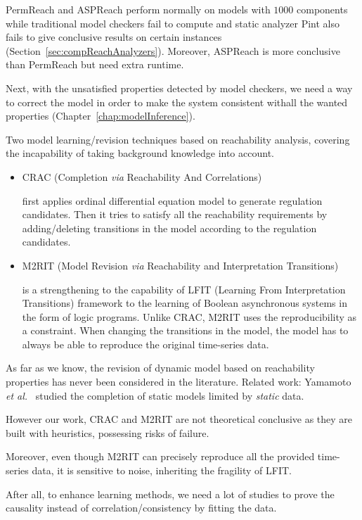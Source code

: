 PermReach and ASPReach perform normally on models with $1000$ components while traditional model checkers fail to compute and static analyzer Pint also fails to give conclusive results on certain instances (Section~\ref{sec:compReachAnalyzers}).
Moreover, ASPReach is more conclusive than PermReach but need extra runtime.

Next, with the unsatisfied properties detected by model checkers, we need a way to correct the model in order to make the system consistent withall the wanted properties (Chapter~\ref{chap:modelInference}).

Two model learning/revision techniques based on reachability analysis, covering the incapability of taking background knowledge into account.

\begin{itemize}
    \item CRAC (Completion \textit{via} Reachability And Correlations)
    
    first applies ordinal differential equation model to generate regulation candidates.
    Then it tries to satisfy all the reachability requirements by adding/deleting transitions in the model according to the regulation candidates.
    
    \item M2RIT (Model Revision \textit{via} Reachability and Interpretation Transitions)
    
    is a strengthening to the capability of LFIT (Learning From Interpretation Transitions) framework to the learning of Boolean asynchronous systems in the form of logic programs.
    Unlike CRAC, M2RIT uses the reproducibility as a constraint.
    When changing the transitions in the model, the model has to always be able to reproduce the original time-series data.
\end{itemize}

As far as we know, the revision of dynamic model based on reachability properties has never been considered in the literature.
Related work: Yamamoto \textit{et al.}~\cite{yamamoto2014completing} studied the completion of static models limited by \textit{static} data.

However our work, CRAC and M2RIT are not theoretical conclusive as they are built with heuristics, possessing risks of failure.

Moreover, even though M2RIT can precisely reproduce all the provided time-series data, it is sensitive to noise, inheriting the fragility of LFIT.

After all, to enhance learning methods, we need a lot of studies to prove the causality instead of correlation/consistency by fitting the data.

